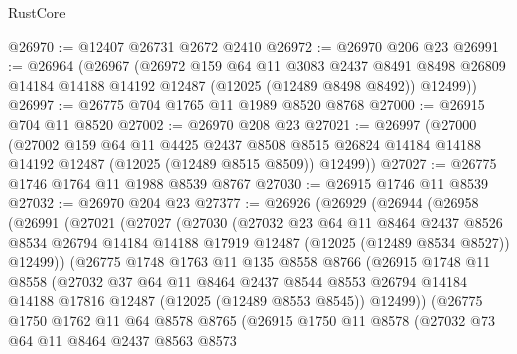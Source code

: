 \begin{lexlean}{RustCore}
\begin{coremodule}
@26970 := @12407 @26731 @2672 @2410
@26972 := @26970 @206 @23
@26991 := @26964
    (@26967
      (@26972
        @159
        @64
        @11
        @3083
        @2437
        @8491
        @8498
        @26809
        @14184
        @14188
        @14192
        @12487
        (@12025 (@12489 @8498 @8492))
        @12499))
@26997 := @26775 @704 @1765 @11 @1989 @8520 @8768
@27000 := @26915 @704 @11 @8520
@27002 := @26970 @208 @23
@27021 := @26997
    (@27000
      (@27002
        @159
        @64
        @11
        @4425
        @2437
        @8508
        @8515
        @26824
        @14184
        @14188
        @14192
        @12487
        (@12025 (@12489 @8515 @8509))
        @12499))
@27027 := @26775 @1746 @1764 @11 @1988 @8539 @8767
@27030 := @26915 @1746 @11 @8539
@27032 := @26970 @204 @23
@27377 := @26926
    (@26929
      (@26944
        (@26958
          (@26991
            (@27021
              (@27027
                (@27030
                  (@27032
                    @23
                    @64
                    @11
                    @8464
                    @2437
                    @8526
                    @8534
                    @26794
                    @14184
                    @14188
                    @17919
                    @12487
                    (@12025 (@12489 @8534 @8527))
                    @12499))
                (@26775
                  @1748
                  @1763
                  @11
                  @135
                  @8558
                  @8766
                  (@26915
                    @1748
                    @11
                    @8558
                    (@27032
                      @37
                      @64
                      @11
                      @8464
                      @2437
                      @8544
                      @8553
                      @26794
                      @14184
                      @14188
                      @17816
                      @12487
                      (@12025 (@12489 @8553 @8545))
                      @12499))
                  (@26775
                    @1750
                    @1762
                    @11
                    @64
                    @8578
                    @8765
                    (@26915
                      @1750
                      @11
                      @8578
                      (@27032
                        @73
                        @64
                        @11
                        @8464
                        @2437
                        @8563
                        @8573

\end{coremodule}
\end{lexlean}
